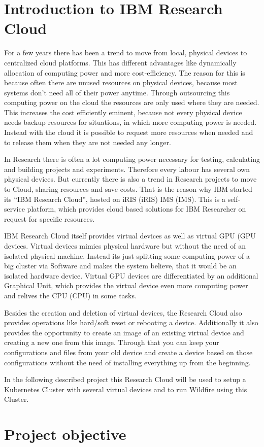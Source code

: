 
\section{Introduction to IBM Research Cloud}

For a few years there has been a trend to move from local, physical devices to centralized cloud platforms. This has different advantages like dynamically allocation of computing power and more cost-efficiency. The reason for this is because often there are unused resources on physical devices, because most systems don't need all of their power anytime. Through outsourcing this computing power on the cloud the resources are only used where they are needed. This increases the cost efficiently eminent, because not every physical device needs backup resources for situations, in which more computing power is needed. Instead with the cloud it is possible to request more resources when needed and to release them when they are not needed any longer.

In Research there is often a lot computing power necessary for testing, calculating and building projects and experiments. Therefore every labour has several own physical devices. But currently there is also a trend in Research projects to move to Cloud, sharing resources and save costs. That is the reason why IBM started its ``IBM Research Cloud'', hosted on \acs{iRIS} (\acl{iRIS}) \acs{IMS} (\acl{IMS}). This is a self-service platform, which provides cloud based solutions for IBM Researcher on request for specific resources.


IBM Research Cloud itself provides virtual devices as well as virtual \acs{GPU} (\acl{GPU} devices. Virtual devices mimics physical hardware but without the need of an isolated physical machine. Instead its just splitting some computing power of a big cluster via Software and makes the system believe, that it would be an isolated hardware device. Virtual GPU devices are differentiated by an additional Graphical Unit, which provides the virtual device even more computing power and relives the \acs{CPU} (\acl{CPU}) in some tasks.


Besides the creation and deletion of virtual devices, the Research Cloud also provides operations like hard/soft reset or rebooting a device. Additionally it also provides the opportunity to create an image of an existing virtual device and creating a new one from this image. Through that you can keep your configurations and files from your old device and create a device based on those configurations without the need of installing everything up from the beginning.

In the following described project this Research Cloud will be used to setup a Kubernetes Cluster with several virtual devices and to run Wildfire using this Cluster.

\section{Project objective}